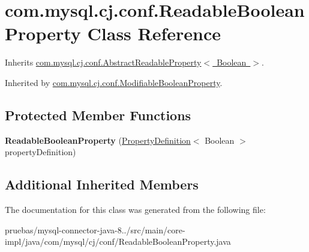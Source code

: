 \hypertarget{classcom_1_1mysql_1_1cj_1_1conf_1_1_readable_boolean_property}{}\section{com.\+mysql.\+cj.\+conf.\+Readable\+Boolean\+Property Class Reference}
\label{classcom_1_1mysql_1_1cj_1_1conf_1_1_readable_boolean_property}


Inherits \mbox{\hyperlink{classcom_1_1mysql_1_1cj_1_1conf_1_1_abstract_readable_property}{com.\+mysql.\+cj.\+conf.\+Abstract\+Readable\+Property$<$ Boolean $>$}}.



Inherited by \mbox{\hyperlink{classcom_1_1mysql_1_1cj_1_1conf_1_1_modifiable_boolean_property}{com.\+mysql.\+cj.\+conf.\+Modifiable\+Boolean\+Property}}.

\subsection*{Protected Member Functions}
\begin{DoxyCompactItemize}
\item 
\mbox{\label{classcom_1_1mysql_1_1cj_1_1conf_1_1_readable_boolean_property_aaa372ed3c27839f75219521766b02bdd}} 
{\bfseries Readable\+Boolean\+Property} (\mbox{\hyperlink{interfacecom_1_1mysql_1_1cj_1_1conf_1_1_property_definition}{Property\+Definition}}$<$ Boolean $>$ property\+Definition)
\end{DoxyCompactItemize}
\subsection*{Additional Inherited Members}


The documentation for this class was generated from the following file\+:\begin{DoxyCompactItemize}
\item 
pruebas/mysql-\/connector-\/java-\/8../src/main/core-\/impl/java/com/mysql/cj/conf/Readable\+Boolean\+Property.\+java\end{DoxyCompactItemize}
